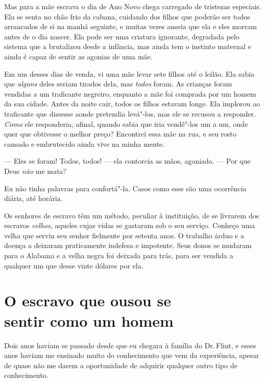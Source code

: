 Mas para a mãe escrava o dia de Ano
Novo chega carregado de tristezas especiais. Ela se senta no chão frio
da cabana, cuidando dos filhos que poderão ser todos arrancados de si na
manhã seguinte, e muitas vezes anseia que ela e eles morram antes de o
dia nascer. Ela pode ser uma criatura ignorante, degradada pelo sistema
que a brutalizou desde a infância, mas ainda tem o instinto maternal e
ainda é capaz de sentir as agonias de uma mãe.

Em um desses dias de venda, vi uma mãe
levar sete filhos até o leilão. Ela sabia que \emph{alguns} deles seriam
tirados dela, mas \emph{todos} foram. As crianças foram vendidas a um
traficante negreiro, enquanto a mãe foi comprada por um homem da sua
cidade. Antes da noite cair, todos os filhos estavam longe. Ela implorou
ao traficante que dissesse aonde pretendia levá"-los, mas ele se recusou
a responder. \emph{Como} ele responderia, afinal, quando sabia que iria
vendê"-los um a um, onde quer que obtivesse o melhor preço? Encontrei
essa mãe na rua, e seu rosto cansado e embrutecido ainda vive na minha
mente.

--- Eles se foram! Todos, todos! --- ela contorcia as mãos, agoniada.
--- Por que Deus \emph{não} me mata?

Eu não tinha palavras para confortá"-la. Casos como esse são uma
ocorrência diária, até horária.

Os senhores de escravo têm um método,
peculiar à instituição, de se livrarem dos escravos \emph{velhos},
aqueles cujas vidas se gastaram sob o seu serviço. Conheço uma velha que
serviu seu senhor fielmente por setenta anos. O trabalho árduo e a
doença a deixaram praticamente indefesa e impotente. Seus donos se
mudaram para o Alabama e a velha negra foi deixada para trás, para ser
vendida a qualquer um que desse vinte dólares por ela.

\chapter*{O escravo que ousou se\\ sentir como um homem}

Dois anos haviam se passado desde que
eu chegara à família do Dr.\,Flint, e esses anos haviam me ensinado muito
do conhecimento que vem da experiência, apesar de quase não me darem a
oportunidade de adquirir qualquer outro tipo de conhecimento.

